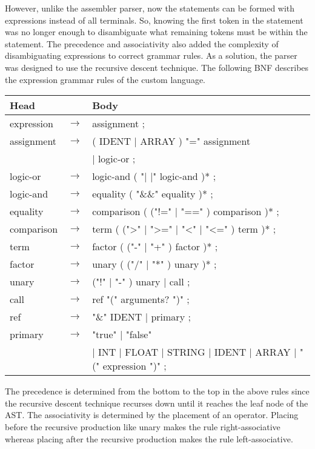 \documentclass[manuscript,screen,nonacm]{acmart}
\begin{document}
However, unlike the assembler parser, now the statements can be formed with expressions instead of all terminals. So, knowing the first token in the statement was no longer enough to disambiguate what remaining tokens must be within the statement. The precedence and associativity also added the complexity of disambiguating expressions to correct grammar rules. 
As a solution, the parser was designed to use the recursive descent technique. The following BNF describes the expression grammar rules of the custom language. 

\begin{center}
\begin{tabular}{l l l}
    \hline
    Head & & Body \\
    \hline
    expression & $\rightarrow$ & assignment ; \\
    assignment & $\rightarrow$ & ( IDENT | ARRAY ) "=" assignment \\
    ~ & ~ & | logic-or ; \\
    logic-or & $\rightarrow$ & logic-and ( "| |" logic-and )* ; \\
    logic-and & $\rightarrow$ & equality ( "\&\&" equality )* ; \\
    equality & $\rightarrow$ & comparison ( ("!=" | "==" ) comparison )* ; \\
    comparison & $\rightarrow$ & term ( (">" | ">=" | "<" | "<=" ) term )* ; \\
    term & $\rightarrow$ & factor ( ("-" | "+" ) factor )* ; \\
    factor & $\rightarrow$ & unary ( ("/" | "*" ) unary )* ; \\
    unary & $\rightarrow$ & ("!" | "-" ) unary | call ; \\
    call & $\rightarrow$ & ref "(" arguments? ")" ; \\
    ref & $\rightarrow$ &  "\&" IDENT | primary ; \\
    primary & $\rightarrow$ & "true" | "false" \\
    ~ & ~ & | INT | FLOAT | STRING | IDENT | ARRAY | "(" expression ")" ; \\
    \hline
\end{tabular}
\end{center}

The precedence is determined from the bottom to the top in the above rules since the recursive descent technique recurses down until it reaches the leaf node of the AST. The associativity is determined by the placement of an operator. Placing before the recursive production like unary makes the rule right-associative whereas placing after the recursive production makes the rule left-associative.
\end{document}
